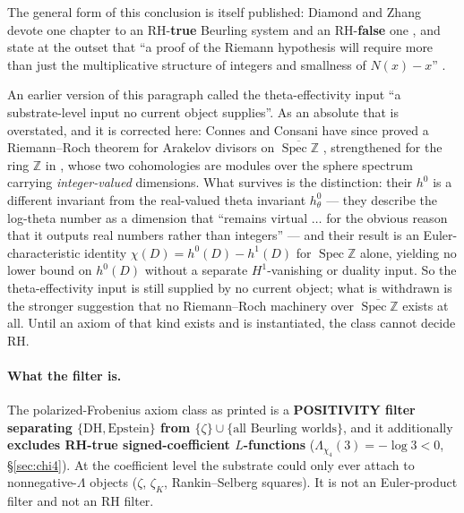 \documentclass[11pt]{article}
\theoremstyle{plain}
\theoremstyle{definition}
\theoremstyle{remark}
\begin{document}
The general form of this conclusion is itself published: Diamond and Zhang
\cite{DZ16} devote one chapter to an RH-\textbf{true} Beurling system
\cite[Thm.~17.11]{DZ16} and an RH-\textbf{false} one \cite[Thm.~17.14]{DZ16}, and
state at the outset that ``a proof of the Riemann hypothesis will require more than
just the multiplicative structure of integers and smallness of $N(x) - x$''
\cite[\S1.1]{DZ16}.

An earlier version of this paragraph called the theta-effectivity input ``a
substrate-level input no current object supplies''. As an absolute that is
overstated, and it is corrected here: Connes and Consani have since proved a
Riemann--Roch theorem for Arakelov divisors on
$\overline{\operatorname{Spec}\mathbb{Z}}$ \cite{CC23}, strengthened for the ring
$\mathbb{Z}$ in \cite{CC24}, whose two cohomologies are modules over the sphere
spectrum carrying \emph{integer-valued} dimensions. What survives is the
distinction: their $h^0$ is a different invariant from the real-valued theta
invariant $h^0_\theta$ --- they describe the log-theta number as a dimension that
``remains virtual $\ldots$ for the obvious reason that it outputs real numbers
rather than integers'' --- and their result is an Euler-characteristic identity
$\chi(D) = h^0(D) - h^1(D)$ for $\operatorname{Spec}\mathbb{Z}$ alone, yielding no
lower bound on $h^0(D)$ without a separate $H^1$-vanishing or duality input. So the
theta-effectivity input is still supplied by no current object; what is withdrawn is
the stronger suggestion that no Riemann--Roch machinery over
$\overline{\operatorname{Spec}\mathbb{Z}}$ exists at all. Until an axiom of that
kind exists and is instantiated, the class cannot decide RH.

\paragraph{What the filter is.} The polarized-Frobenius axiom class as printed
is a \textbf{POSITIVITY filter separating $\{\mathrm{DH}, \mathrm{Epstein}\}$
from $\{\zeta\} \cup \{\text{all Beurling worlds}\}$}, and it additionally
\textbf{excludes RH-true signed-coefficient $L$-functions}
($\Lambda_{\chi_4}(3) = -\log 3 < 0$, \S\ref{sec:chi4}). At the coefficient
level the substrate could only ever attach to nonnegative-$\Lambda$ objects
($\zeta$, $\zeta_K$, Rankin--Selberg squares). It is not an Euler-product
filter and not an RH filter.
\end{document}
